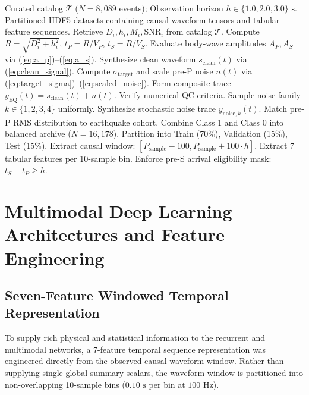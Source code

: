 \documentclass[journal]{IEEEtran}
\begin{document}
\begin{algorithm}[t]
\caption{Physics-Informed Waveform Simulation and Causal Extraction}
\label{alg:data_generation}
\begin{algorithmic}[1]
\REQUIRE Curated catalog $\mathcal{T}$ ($N = 8,089$ events); Observation horizon $h \in \{1.0, 2.0, 3.0\}\text{ s}$.
\ENSURE Partitioned HDF5 datasets containing causal waveform tensors and tabular feature sequences.
    \STATE Retrieve $D_i, h_i, M_i, \text{SNR}_i$ from catalog $\mathcal{T}$.
    \STATE Compute $R = \sqrt{D_i^2 + h_i^2}$, $t_P = R/V_P$, $t_S = R/V_S$.
    \STATE Evaluate body-wave amplitudes $A_P, A_S$ via (\ref{eq:a_p})--(\ref{eq:a_s}).
    \STATE Synthesize clean waveform $s_{\text{clean}}(t)$ via (\ref{eq:clean_signal}).
    \STATE Compute $\sigma_{\text{target}}$ and scale pre-P noise $n(t)$ via (\ref{eq:target_sigma})--(\ref{eq:scaled_noise}).
    \STATE Form composite trace $y_{\text{EQ}}(t) = s_{\text{clean}}(t) + n(t)$.
    \STATE Verify numerical QC criteria.
\ENDFOR
{}
    \STATE Sample noise family $k \in \{1, 2, 3, 4\}$ uniformly.
    \STATE Synthesize stochastic noise trace $y_{\text{noise}, k}(t)$.
    \STATE Match pre-P RMS distribution to earthquake cohort.
\ENDFOR
\STATE Combine Class 1 and Class 0 into balanced archive ($N = 16,178$).
\STATE Partition into Train (70\%), Validation (15\%), Test (15\%).
    \STATE Extract causal window: $[P_{\text{sample}} - 100, P_{\text{sample}} + 100 \cdot h]$.
    \STATE Extract 7 tabular features per 10-sample bin.
    \STATE Enforce pre-S arrival eligibility mask: $t_S - t_P \ge h$.
\ENDFOR
\end{algorithmic}
\end{algorithm}

\section{Multimodal Deep Learning Architectures and Feature Engineering}

\subsection{Seven-Feature Windowed Temporal Representation}
To supply rich physical and statistical information to the recurrent and multimodal networks, a 7-feature temporal sequence representation was engineered directly from the observed causal waveform window. Rather than supplying single global summary scalars, the waveform window is partitioned into non-overlapping 10-sample bins ($0.10\text{ s}$ per bin at $100\text{ Hz}$).
\end{document}
